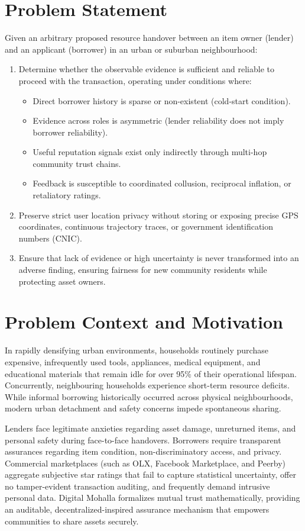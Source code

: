 \section{Problem Statement}
Given an arbitrary proposed resource handover between an item owner (lender) and an applicant (borrower) in an urban or suburban neighbourhood:
\begin{enumerate}
    \item Determine whether the observable evidence is sufficient and reliable to proceed with the transaction, operating under conditions where:
    \begin{itemize}
        \item Direct borrower history is sparse or non-existent (cold-start condition).
        \item Evidence across roles is asymmetric (lender reliability does not imply borrower reliability).
        \item Useful reputation signals exist only indirectly through multi-hop community trust chains.
        \item Feedback is susceptible to coordinated collusion, reciprocal inflation, or retaliatory ratings.
    \end{itemize}
    \item Preserve strict user location privacy without storing or exposing precise GPS coordinates, continuous trajectory traces, or government identification numbers (CNIC).
    \item Ensure that lack of evidence or high uncertainty is never transformed into an adverse finding, ensuring fairness for new community residents while protecting asset owners.
\end{enumerate}

\section{Problem Context and Motivation}
In rapidly densifying urban environments, households routinely purchase expensive, infrequently used tools, appliances, medical equipment, and educational materials that remain idle for over 95\% of their operational lifespan. Concurrently, neighbouring households experience short-term resource deficits. While informal borrowing historically occurred across physical neighbourhoods, modern urban detachment and safety concerns impede spontaneous sharing.

Lenders face legitimate anxieties regarding asset damage, unreturned items, and personal safety during face-to-face handovers. Borrowers require transparent assurances regarding item condition, non-discriminatory access, and privacy. Commercial marketplaces (such as OLX, Facebook Marketplace, and Peerby) aggregate subjective star ratings that fail to capture statistical uncertainty, offer no tamper-evident transaction auditing, and frequently demand intrusive personal data. Digital Mohalla formalizes mutual trust mathematically, providing an auditable, decentralized-inspired assurance mechanism that empowers communities to share assets securely.

